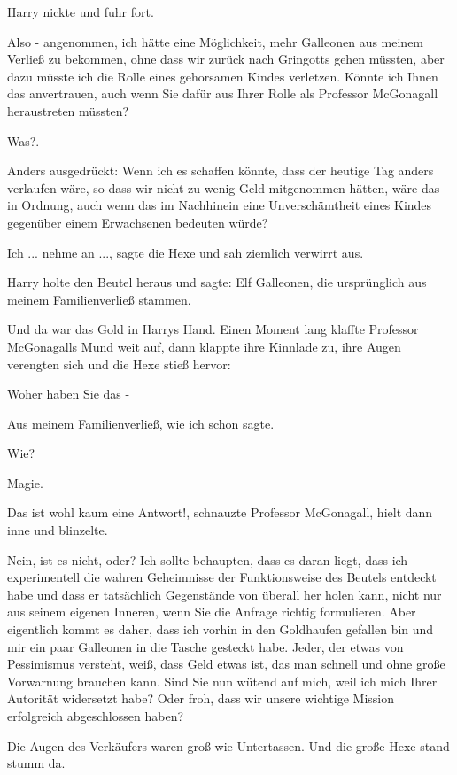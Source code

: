 Harry nickte und fuhr fort.

\glqq Also - angenommen, ich hätte eine Möglichkeit, mehr Galleonen aus meinem
Verließ zu bekommen, ohne dass wir zurück nach Gringotts gehen müssten, aber
dazu müsste ich die Rolle eines gehorsamen Kindes verletzen. Könnte ich Ihnen
das anvertrauen, auch wenn Sie dafür aus Ihrer Rolle als Professor McGonagall
heraustreten müssten?\grqq{}

\glqq Was?\grqq{}.

\glqq Anders ausgedrückt: Wenn ich es schaffen könnte, dass der heutige Tag
anders verlaufen wäre, so dass wir nicht zu wenig Geld mitgenommen hätten, wäre
das in Ordnung, auch wenn das im Nachhinein eine Unverschämtheit eines Kindes
gegenüber einem Erwachsenen bedeuten würde?\grqq{}

\glqq Ich ... nehme an ...\grqq{}, sagte die Hexe und sah ziemlich verwirrt aus.

Harry holte den Beutel heraus und sagte: \glqq Elf Galleonen, die ursprünglich
aus meinem Familienverließ stammen.\grqq{}

Und da war das Gold in Harrys Hand. Einen Moment lang klaffte Professor
McGonagalls Mund weit auf, dann klappte ihre Kinnlade zu, ihre Augen verengten
sich und die Hexe stieß hervor:

\glqq Woher haben Sie das -\grqq{}

\glqq Aus meinem Familienverließ, wie ich schon sagte.\grqq{}

\glqq Wie?\grqq{}

\glqq Magie.\grqq{}

\glqq Das ist wohl kaum eine Antwort!\grqq{}, schnauzte Professor McGonagall,
hielt dann inne und blinzelte.

\glqq Nein, ist es nicht, oder? Ich sollte behaupten, dass es daran liegt, dass
ich experimentell die wahren Geheimnisse der Funktionsweise des Beutels entdeckt
habe und dass er tatsächlich Gegenstände von überall her holen kann, nicht nur
aus seinem eigenen Inneren, wenn Sie die Anfrage richtig formulieren. Aber
eigentlich kommt es daher, dass ich vorhin in den Goldhaufen gefallen bin und
mir ein paar Galleonen in die Tasche gesteckt habe. Jeder, der etwas von
Pessimismus versteht, weiß, dass Geld etwas ist, das man schnell und ohne große
Vorwarnung brauchen kann. Sind Sie nun wütend auf mich, weil ich mich Ihrer
Autorität widersetzt habe? Oder froh, dass wir unsere wichtige Mission
erfolgreich abgeschlossen haben?\grqq{}

Die Augen des Verkäufers waren groß wie Untertassen. Und die große Hexe stand
stumm da.

